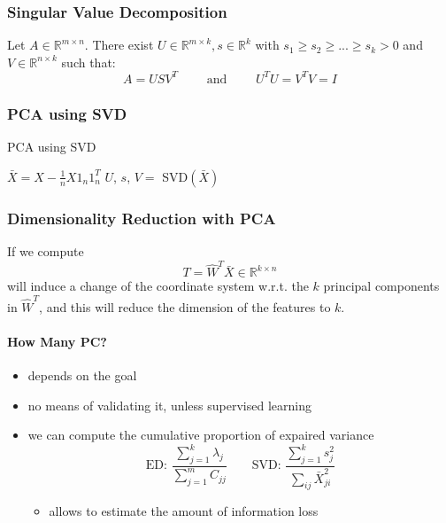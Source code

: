 \documentclass[a4paper,6pt,twocolumn,fleqn]{article}
\begin{document}
\subsubsection{Singular Value Decomposition} %
Let \(A \in \mathbb{R}^{m \times n}\). There exist \(U \in \mathbb{R}^{m \times k}, s \in \mathbb{R}^k\) with \(s_1 \geq s_2 \geq ... \geq s_k > 0\) and \(V \in \mathbb{R}^{n \times k}\) such that:
\begin{equation}
    A = USV^T \qquad \text{ and } \qquad U^TU = V^TV = I
\end{equation}

\subsubsection{PCA using SVD} %
\begin{algorithm}
    \caption{PCA using SVD}
    $\bar X = X - \frac 1 n X 1_n 1_n^T$\;
    $U$, $s$, $V = $ SVD$(\bar X)$\;
\end{algorithm}
\subsubsection{Dimensionality Reduction with PCA} %
If we compute 
\begin{equation}
    T = \hat W^T \bar X \in \mathbb R^{k \times n}
\end{equation}
will induce a change of the coordinate system w.r.t. the \(k\) principal components in \(\hat W^T\), and this will reduce the dimension of the features to \(k\).
\paragraph{How Many PC?}
\begin{itemize}
    \item depends on the goal
    \item no means of validating it, unless supervised learning
    \item we can compute the cumulative proportion of expaired variance
    \begin{equation}
        \text{ED: } \frac {\sum_{j=1}^k \lambda_j} {\sum_{j=1}^m C_{jj}} \qquad \text{SVD: } \frac {\sum_{j=1}^k s_j^2} {\sum_{ij} \bar X_{ji}^2}
    \end{equation}
    \begin{itemize}
        \item allows to estimate the amount of information loss
    \end{itemize}
\end{itemize}
\end{document}
